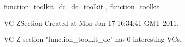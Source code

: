 \documentclass{article}
\begin{document}

\begin{zsection}
	 \SECTION function\_toolkit\_dc \parents~dc\_toolkit , function\_toolkit
\end{zsection}

\newcommand{\appliesTo}{\zbinop{appliesTo}} 
\newcommand{\appliesToNofix}{\zpreop{appliesToNofix}} 

VC ZSection Created at Mon Jan 17 16:34:41 GMT 2011.



 VC Z section "function_toolkit_dc" has $0$ interesting VCs.



\end{document}
